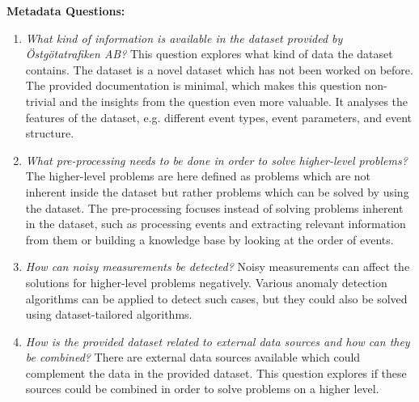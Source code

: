 \begin{description}
  \item \textbf{Metadata Questions:}
  \begin{enumerate}
    \item \textit{What kind of information is available in the dataset provided by Östgötatrafiken AB?} \newline
    This question explores what kind of data the dataset contains.
    The dataset is a novel dataset which has not been worked on before.
    The provided documentation is minimal, which makes this question non-trivial and the insights from the question even more valuable.
    It analyses the features of the dataset, e.g. different event types, event parameters, and event structure.
    \item \textit{What pre-processing needs to be done in order to solve higher-level problems?} \newline
    The higher-level problems are here defined as problems which are not inherent inside the dataset but rather problems which can be solved by using the dataset.
    The pre-processing focuses instead of solving problems inherent in the dataset, such as processing events and extracting relevant information from them or building a knowledge base by looking at the order of events.
    \item \textit{How can noisy measurements be detected?} \newline
    Noisy measurements can affect the solutions for higher-level problems negatively.
    Various anomaly detection algorithms can be applied to detect such cases, but they could also be solved using dataset-tailored algorithms.
    \item \textit{How is the provided dataset related to external data sources and how can they be combined?} \newline
    There are external data sources available which could complement the data in the provided dataset.
    This question explores if these sources could be combined in order to solve problems on a higher level. 
  \end{enumerate}


\end{description}
